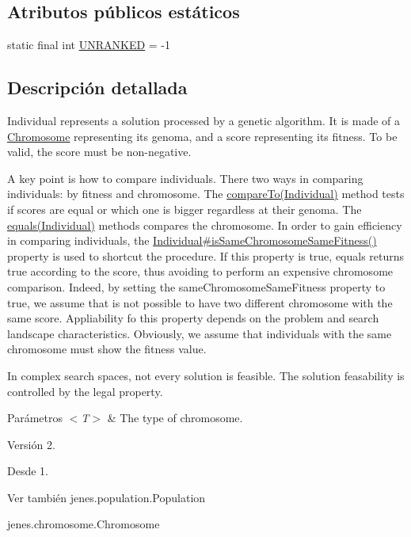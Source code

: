 \subsection*{Atributos públicos estáticos}
\begin{DoxyCompactItemize}
\item 
static final int \hyperlink{classjenes_1_1population_1_1_individual_3_01_t_01extends_01_chromosome_01_4_a6f913202241aa5f7255e482179175f62}{U\-N\-R\-A\-N\-K\-E\-D} = -\/1
\end{DoxyCompactItemize}


\subsection{Descripción detallada}
Individual represents a solution processed by a genetic algorithm. It is made of a \hyperlink{}{Chromosome} representing its genoma, and a score representing its fitness. To be valid, the score must be non-\/negative. 

A key point is how to compare individuals. There two ways in comparing individuals\-: by fitness and chromosome. The \hyperlink{}{compare\-To(\-Individual)} method tests if scores are equal or which one is bigger regardless at their genoma. The \hyperlink{}{equals(\-Individual)} methods compares the chromosome. In order to gain efficiency in comparing individuals, the \hyperlink{}{Individual\#is\-Same\-Chromosome\-Same\-Fitness()} property is used to shortcut the procedure. If this property is true, {\ttfamily equals} returns true according to the score, thus avoiding to perform an expensive chromosome comparison. Indeed, by setting the {\ttfamily same\-Chromosome\-Same\-Fitness} property to true, we assume that is not possible to have two different chromosome with the same score. Appliability fo this property depends on the problem and search landscape characteristics. Obviously, we assume that individuals with the same chromosome must show the fitness value. 

In complex search spaces, not every solution is feasible. The solution feasability is controlled by the {\ttfamily legal} property.


\begin{DoxyParams}{Parámetros}
{\em $<$\-T$>$} & The type of chromosome.\\
\hline
\end{DoxyParams}
\begin{DoxyVersion}{Versión}
2. 
\end{DoxyVersion}
\begin{DoxySince}{Desde}
1.
\end{DoxySince}
\begin{DoxySeeAlso}{Ver también}
jenes.\-population.\-Population 

jenes.\-chromosome.\-Chromosome 
\end{DoxySeeAlso}


